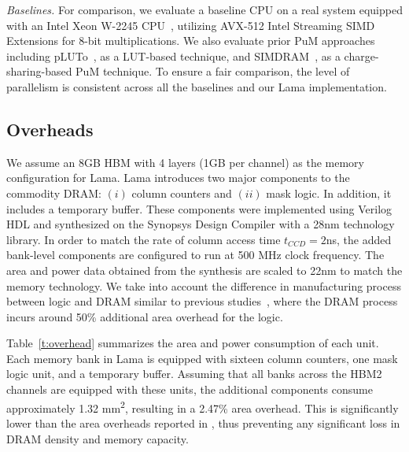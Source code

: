 \textit{Baselines.} For comparison, we evaluate a baseline CPU on a real system equipped with an Intel\textsuperscript{\circledR} Xeon W-2245 CPU~\cite{intel}, utilizing AVX-512 Intel\textsuperscript{\circledR} Streaming SIMD Extensions for 8-bit multiplications. We also evaluate prior PuM approaches including pLUTo~\cite{pluto}, as a LUT-based technique, and SIMDRAM~\cite{simdram}, as a charge-sharing-based PuM technique. To ensure a fair comparison, the level of parallelism is consistent across all the baselines and our Lama implementation.

\subsection{Overheads}\label{overhead}
We assume an 8GB HBM with 4 layers (1GB per channel) as the memory configuration for Lama. Lama introduces two major components to the commodity DRAM: $(i)$ column counters and $(ii)$ mask logic. In addition, it includes a temporary buffer. These components were implemented using Verilog HDL and synthesized on the Synopsys Design Compiler with a 28nm technology library. In order to match the rate of column access time $t_{CCD} = 2$ns, the added bank-level components are configured to run at 500 MHz clock frequency. The area and power data obtained from the synthesis are scaled to 22nm to match the memory technology. We take into account the difference in manufacturing process between logic and DRAM similar to previous studies~\cite{technology_difference, transpim, drisa, fulcrum}, where the DRAM process incurs around 50\% additional area overhead for the logic.

Table~\ref{t:overhead} summarizes the area and power consumption of each unit. Each memory bank in Lama is equipped with sixteen column counters, one mask logic unit, and a temporary buffer. Assuming that all banks across the HBM2 channels are equipped with these units, the additional components consume approximately 1.32 mm\textsuperscript{2}, resulting in a 2.47\% area overhead. This is significantly lower than the area overheads reported in \cite{pluto, simdram}, thus preventing any significant loss in DRAM density and memory capacity.


